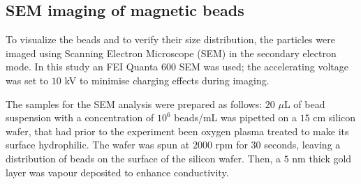 
\subsection{SEM imaging of magnetic beads}\label{subsec:semImaging}
To visualize the beads and to verify their size distribution, the particles were imaged using Scanning Electron Microscope (SEM) in the secondary electron mode. In this study an FEI\textsuperscript{\texttrademark} Quanta\textsuperscript{\texttrademark} 600 SEM was used; the accelerating voltage was set to $10$ kV to minimise charging effects during imaging. 

The samples for the SEM analysis were prepared as follows: $20$ $\mu$L of bead suspension with a concentration of $10^{6}$ beads/mL was pipetted on a $15$ cm silicon wafer, that had prior to the experiment been oxygen plasma treated to make its surface hydrophilic. The wafer was spun at $2000$ rpm for $30$ seconds, leaving a distribution of beads on the surface of the silicon wafer. Then, a $5$ nm thick gold layer was vapour deposited to enhance conductivity. 

